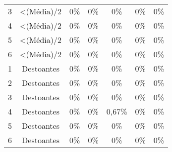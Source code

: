 \begin{table}[]
\begin{tabular}{|c|c|ccccc|}
3                         & \textless (Média)/2                                                        & 0\%                     & 0\%                     & 0\%                     & 0\%                     & 0\%                      \\
4                         & \textless (Média)/2                                                        & 0\%                     & 0\%                     & 0\%                     & 0\%                     & 0\%                      \\
5                         & \textless (Média)/2                                                        & 0\%                     & 0\%                     & 0\%                     & 0\%                     & 0\%                      \\
6                         & \textless (Média)/2                                                        & 0\%                     & 0\%                     & 0\%                     & 0\%                     & 0\%                      \\ \hline
1                         & Destoantes                                                                 & 0\%                     & 0\%                     & 0\%                     & 0\%                     & 0\%                      \\
2                         & Destoantes                                                                 & 0\%                     & 0\%                     & 0\%                     & 0\%                     & 0\%                      \\
3                         & Destoantes                                                                 & 0\%                     & 0\%                     & 0\%                     & 0\%                     & 0\%                      \\
4                         & Destoantes                                                                 & 0\%                     & 0\%                     & 0,67\%                     & 0\%                     & 0\%                      \\
5                         & Destoantes                                                                 & 0\%                     & 0\%                     & 0\%                     & 0\%                     & 0\%                      \\
6                         & Destoantes                                                                 & 0\%                     & 0\%                     & 0\%                     & 0\%                     & 0\%                      \\ \hline

\end{tabular}
\end{table}
